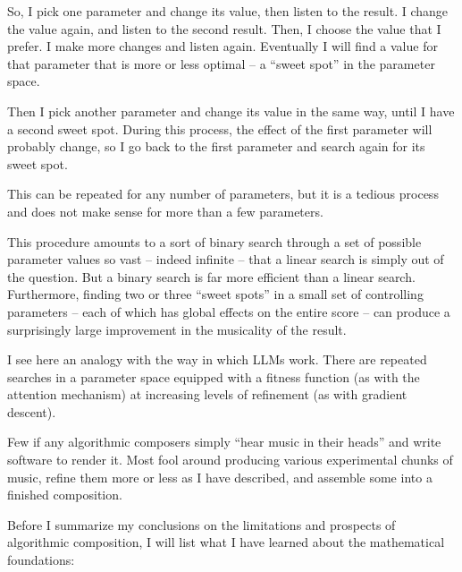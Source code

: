 \documentclass[11pt,papersize=a4]{scrartcl}
\begin{document}
So, I pick one parameter and change its value, then listen to the result. I change the value again, and listen to the second result. Then, I choose the value that I prefer. I make more changes and listen again. Eventually I will find a value for that parameter that is more or less optimal – a ``sweet spot'' in the parameter space.

Then I pick another parameter and change its value in the same way, until I have a second sweet spot. During this process, the effect of the first parameter will probably change, so I go back to the first parameter and search again for its sweet spot.

This can be repeated for any number of parameters, but it is a tedious process and does not make sense for more than a few parameters.

This procedure amounts to a sort of binary search through a set of possible parameter values so vast – indeed infinite – that a linear search is simply out of the question. But a binary search is far more efficient than a linear search. Furthermore, finding two or three ``sweet spots'' in a small set of controlling parameters – each of which has global effects on the entire score – can produce a surprisingly large improvement in the musicality of the result.

I see here an analogy with the way in which LLMs work. There are repeated searches in a parameter space equipped with a fitness function (as with the attention mechanism) at increasing levels of refinement (as with gradient descent).

Few if any algorithmic composers simply ``hear music in their heads'' and write software to render it. Most fool around producing various experimental chunks of music, refine them more or less as I have described, and assemble some into a finished composition.

Before I summarize my conclusions on the limitations and prospects of algorithmic composition, I will list what I have learned about the mathematical foundations:
\end{document}

